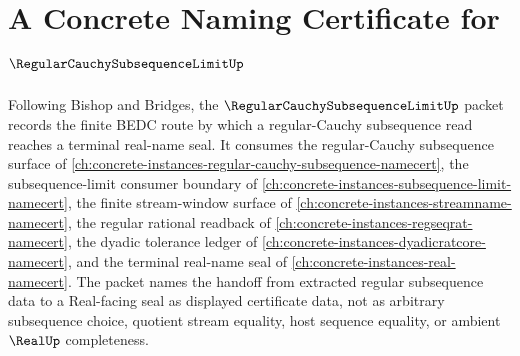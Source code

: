 \chapter{A Concrete Naming Certificate for $\RegularCauchySubsequenceLimitUp$}
\label{ch:concrete-instances-regular-cauchy-subsequence-limit-namecert}

Following Bishop and Bridges, the $\RegularCauchySubsequenceLimitUp$ packet records the finite BEDC route by which a regular-Cauchy subsequence read reaches a terminal real-name seal. It consumes the regular-Cauchy subsequence surface of \autoref{ch:concrete-instances-regular-cauchy-subsequence-namecert}, the subsequence-limit consumer boundary of \autoref{ch:concrete-instances-subsequence-limit-namecert}, the finite stream-window surface of \autoref{ch:concrete-instances-streamname-namecert}, the regular rational readback of \autoref{ch:concrete-instances-regseqrat-namecert}, the dyadic tolerance ledger of \autoref{ch:concrete-instances-dyadicratcore-namecert}, and the terminal real-name seal of \autoref{ch:concrete-instances-real-namecert}. The packet names the handoff from extracted regular subsequence data to a Real-facing seal as displayed certificate data, not as arbitrary subsequence choice, quotient stream equality, host sequence equality, or ambient $\RealUp$ completeness.

